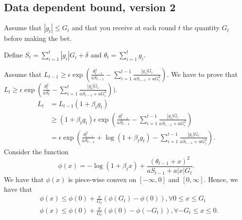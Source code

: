 % 

\subsection{Data dependent bound, version 2}

Assume that $|g_t|\leq G_t$ and that you receive at each round $t$ the quantity $G_t$ before making the bet.

Define $S_t = \sum_{i=1}^t |g_i| G_i + \delta$ and $\theta_t=\sum_{i=1}^t g_i$.

Assume that $L_{t-1}\geq \epsilon \exp(\frac{\theta_{t-1}^2}{a S_{t-1}}- \sum_{i=1}^{t-1} \frac{|g_i| G_i}{a S_{i-1} + a G^2_i})$.
We have to prove that $L_{t}\geq \epsilon \exp(\frac{\theta_{t}^2}{a S_t}- \sum_{i=1}^{t} \frac{|g_i| G_i}{a S_{i-1} + a G^2_i}))$.
\begin{align}
L_{t} &= L_{t-1} (1+\beta_t g_t) \\
&\geq (1+\beta_t g_t) \epsilon \exp(\frac{\theta_{t-1}^2}{a S_{t-1}}- \sum_{i=1}^{t-1} \frac{|g_i| G_i}{a S_{i-1} + a G^2_i}) \\
&=  \epsilon \exp(\frac{\theta_{t-1}^2}{a S_{t-1}}+\log(1+\beta_t g_t)- \sum_{i=1}^{t-1} \frac{|g_i| G_i}{a S_{i-1} + a G^2_i}) .
\end{align}
Consider the function 
\[
\phi(x)=-\log(1+\beta_t x) + \frac{(\theta_{t-1}+x)^2}{a S_{t-1} + a |x| G_t}.
\]
We have that $\phi(x)$ is piece-wise convex on $[-\infty,0]$ and $[0,\infty]$. Hence, we have that
\begin{align}
&\phi(x) \leq \phi(0)+\frac{x}{G_t} (\phi(G_t)-\phi(0)), \forall 0 \leq x\leq G_t\\
&\phi(x) \leq \phi(0)+\frac{x}{G_t} (\phi(0)-\phi(-G_t)), \forall -G_t \leq x\leq 0.
\end{align}

